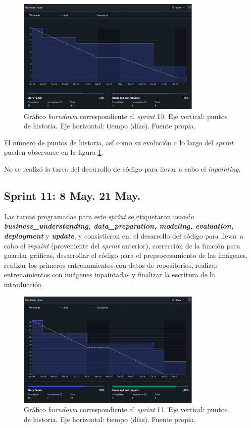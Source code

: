 \begin{figure}[h]
    \centering
    \includegraphics[width=0.8\textwidth]{img/bd_23abr.png}
    \caption{Gráfico \textit{burndown} correspondiente al \textit{sprint} 10. Eje vertical: puntos de historia. Eje horizontal: tiempo (días). Fuente propia.}
    \label{fig:bd_10}
\end{figure}

El número de puntos de historia, así como su evolución a lo largo del \textit{sprint} pueden observarse en la figura \ref{fig:bd_10}.

No se realizó la tarea del desarrollo de código para llevar a cabo el \textit{inpainting}.

\subsection{Sprint 11: 8 May. 21 May.}

Las tareas programadas para este \textit{sprint} se etiquetaron usando \textbf{\textit{business\_understanding, data\_preparation, modeling, evaluation, deployment}} y \textbf{\textit{update}}, y consistieron en: el desarrollo del código para llevar a cabo el \textit{inpaint} (proveniente del \textit{sprint} anterior), corrección de la función para guardar gráficas, desarrollar el código para el preprocesamiento de las imágenes, realizar los primeros entrenamientos con datos de repositorios, realizar entrenamientos con imágenes inpaintadas y finalizar la escritura de la introducción. 

\begin{figure}[h]
    \centering
    \includegraphics[width=0.8\textwidth]{img/bd_8may.png}
    \caption{Gráfico \textit{burndown} correspondiente al \textit{sprint} 11. Eje vertical: puntos de historia. Eje horizontal: tiempo (días). Fuente propia.}
    \label{fig:bd_11}
\end{figure}

